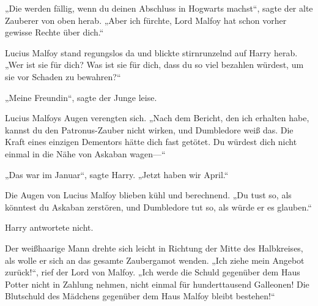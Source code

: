 „Die werden fällig, wenn du deinen Abschluss in Hogwarts machst“, sagte der alte Zauberer von oben herab.
„Aber ich fürchte, Lord Malfoy hat schon vorher gewisse Rechte über dich.“

Lucius Malfoy stand regungslos da und blickte stirnrunzelnd auf Harry herab.
„Wer ist sie für dich? Was ist sie für dich, dass du so viel bezahlen würdest, um sie vor Schaden zu bewahren?“

„Meine Freundin“, sagte der Junge leise.

Lucius Malfoys Augen verengten sich.
„Nach dem Bericht, den ich erhalten habe, kannst du den Patronus-Zauber nicht wirken, und Dumbledore weiß das. Die Kraft eines einzigen Dementors hätte dich fast getötet. Du würdest dich nicht einmal in die Nähe von Askaban wagen—“

„Das war im Januar“, sagte Harry.
„Jetzt haben wir April.“

Die Augen von Lucius Malfoy blieben kühl und berechnend.
„Du tust so, als könntest du Askaban zerstören, und Dumbledore tut so, als würde er es glauben.“

Harry antwortete nicht.

Der weißhaarige Mann drehte sich leicht in Richtung der Mitte des Halbkreises, als wolle er sich an das gesamte Zaubergamot wenden.
„Ich ziehe mein Angebot zurück!“, rief der Lord von Malfoy.
„Ich werde die Schuld gegenüber dem Haus Potter nicht in Zahlung nehmen, nicht einmal für hunderttausend Galleonen! Die Blutschuld des Mädchens gegenüber dem Haus Malfoy bleibt bestehen!“

